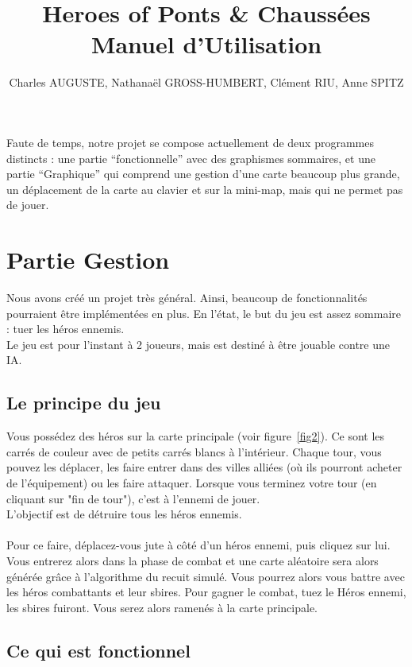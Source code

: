 \documentclass[11pt,a4paper]{article}
\begin{document}
\title{Heroes of Ponts \& Chaussées \\ Manuel d'Utilisation}
\author{Charles AUGUSTE, Nathanaël GROSS-HUMBERT, Clément RIU, Anne SPITZ}
\maketitle

Faute de temps, notre projet se compose actuellement de deux programmes distincts : une partie ``fonctionnelle'' avec des graphismes sommaires, et une partie ``Graphique'' qui comprend une gestion d'une carte beaucoup plus grande, un déplacement de la carte au clavier et sur la mini-map, mais qui ne permet pas de jouer.

\section{Partie Gestion}

Nous avons créé un projet très général. Ainsi, beaucoup de fonctionnalités pourraient être implémentées en plus. En l'état, le but du jeu est assez sommaire : tuer les héros ennemis. \\
Le jeu est pour l'instant à 2 joueurs, mais est destiné à être jouable contre une IA.

\subsection{Le principe du jeu}

Vous possédez des héros sur la carte principale (voir figure~\ref{fig2}). Ce sont les carrés de couleur avec de petits carrés blancs à  l'intérieur. Chaque tour, vous pouvez les déplacer, les faire entrer dans des villes alliées (où ils pourront acheter de l'équipement) ou les faire attaquer. Lorsque vous terminez votre tour (en cliquant sur "fin de tour"), c'est à l'ennemi de jouer. \\
L'objectif est de détruire tous les héros ennemis. \\
\\
Pour ce faire, déplacez-vous jute à côté d'un héros ennemi, puis cliquez sur lui. Vous entrerez alors dans la phase de combat et une carte aléatoire sera alors générée grâce à l'algorithme du recuit simulé. Vous pourrez alors vous battre avec les héros combattants et leur sbires. Pour gagner le combat, tuez le Héros ennemi, les sbires fuiront. Vous serez alors ramenés à la carte principale.

\subsection{Ce qui est fonctionnel}
\end{document}
